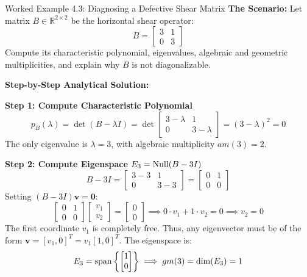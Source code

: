 \begin{examplebox}{Worked Example 4.3: Diagnosing a Defective Shear Matrix}
\label{ex:w04_defective_matrix}
\textbf{The Scenario:}
Let matrix $B \in \mathbb{R}^{2 \times 2}$ be the horizontal shear operator:
\begin{equation*}
B = \begin{bmatrix} 3 & 1 \\ 0 & 3 \end{bmatrix}
\end{equation*}
Compute its characteristic polynomial, eigenvalues, algebraic and geometric multiplicities, and explain why $B$ is not diagonalizable.

\tcblower
\textbf{Step-by-Step Analytical Solution:}

\textbf{Step 1: Compute Characteristic Polynomial}
\begin{equation*}
p_B(\lambda) = \det(B - \lambda I) = \det\begin{bmatrix} 3 - \lambda & 1 \\ 0 & 3 - \lambda \end{bmatrix} = (3 - \lambda)^2 = 0
\end{equation*}
The only eigenvalue is $\lambda = 3$, with algebraic multiplicity $am(3) = 2$.

\textbf{Step 2: Compute Eigenspace $E_3 = \operatorname{Null}(B - 3I)$}
\begin{equation*}
B - 3I = \begin{bmatrix} 3 - 3 & 1 \\ 0 & 3 - 3 \end{bmatrix} = \begin{bmatrix} 0 & 1 \\ 0 & 0 \end{bmatrix}
\end{equation*}
Setting $(B - 3I)\mathbf{v} = \mathbf{0}$:
\begin{equation*}
\begin{bmatrix} 0 & 1 \\ 0 & 0 \end{bmatrix} \begin{bmatrix} v_1 \\ v_2 \end{bmatrix} = \begin{bmatrix} 0 \\ 0 \end{bmatrix} \implies 0 \cdot v_1 + 1 \cdot v_2 = 0 \implies v_2 = 0
\end{equation*}
The first coordinate $v_1$ is completely free. Thus, any eigenvector must be of the form $\mathbf{v} = [v_1, 0]^T = v_1 [1, 0]^T$.
The eigenspace is:
\begin{equation*}
E_3 = \operatorname{span}\left\{ \begin{bmatrix} 1 \\ 0 \end{bmatrix} \right\} \implies gm(3) = \dim(E_3) = 1
\end{equation*}


\end{examplebox}
